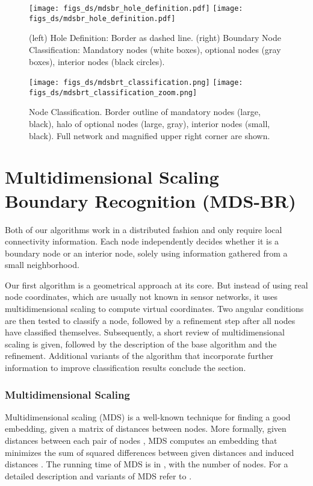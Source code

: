 \documentclass{llncs}
\begin{document}
\begin{figure}[t]
\begin{minipage}{0.48\columnwidth}
\centering
\texttt{[image: figs\_ds/mdsbr\_hole\_definition.pdf]}
\hspace{2em}
\texttt{[image: figs\_ds/mdsbr\_hole\_definition.pdf]}
\caption{(left) Hole Definition: Border as dashed line. (right) Boundary Node Classification: Mandatory nodes (white boxes), optional nodes (gray boxes), interior nodes (black circles).}\label{fig:hole_definition}
\end{minipage}
\hfill
\begin{minipage}{0.48\columnwidth}
\centering
\texttt{[image: figs\_ds/mdsbrt\_classification.png]}
\hfill
\texttt{[image: figs\_ds/mdsbrt\_classification\_zoom.png]}
\caption{Node Classification. Border outline of mandatory nodes (large, black), halo of optional nodes (large, gray), interior nodes (small, black). Full network and magnified upper right corner are shown.}\label{fig:hole_definition2}
\end{minipage}
\end{figure}


\section{Multidimensional Scaling Boundary Recognition (MDS-BR)}\label{sec:mdsbr}
Both of our algorithms work in a distributed fashion and only require local connectivity information.
Each node independently decides whether it is a boundary node or an interior node, solely using information gathered from a small neighborhood.

Our first algorithm is a geometrical approach at its core.
But instead of using real node coordinates, which are usually not known in sensor networks, it uses multidimensional scaling to compute virtual coordinates.
Two angular conditions are then tested to classify a node, followed by a refinement step after all nodes have classified themselves.
Subsequently, a short review of multidimensional scaling is given, followed by the description of the base algorithm and the refinement.
Additional variants of the algorithm that incorporate further information to improve classification results conclude the section.

\subsubsection{Multidimensional Scaling}
Multidimensional scaling (MDS) \cite{t-mdstm-52} is a well-known technique for finding a good embedding, given a matrix of distances between nodes.
More formally, given distances  between each pair of nodes , MDS computes an embedding  that minimizes the sum  of squared differences between given distances  and induced distances .
The running time of MDS is in , with  the number of nodes.
For a detailed description and variants of MDS refer to \cite{cc-mds-01}.
\end{document}

